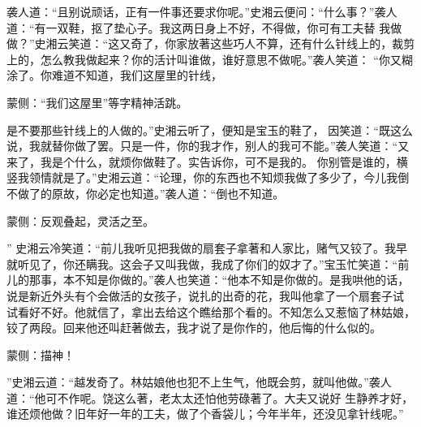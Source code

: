 \begin{parag}
    袭人道：“且别说顽话，正有一件事还要求你呢。”史湘云便问：“什么事？”袭人道：“有一双鞋，抠了垫心子。我这两日身上不好，不得做，你可有工夫替 我做做？”史湘云笑道：“这又奇了，你家放著这些巧人不算，还有什么针线上的，裁剪上的，怎么教我做起来？你的活计叫谁做，谁好意思不做呢。”袭人笑道： “你又糊涂了。你难道不知道，我们这屋里的针线，\begin{note}蒙侧：“我们这屋里”等字精神活跳。\end{note}是不要那些针线上的人做的。”史湘云听了，便知是宝玉的鞋了， 因笑道：“既这么说，我就替你做了罢。只是一件，你的我才作，别人的我可不能。”袭人笑道：“又来了，我是个什么，就烦你做鞋了。实告诉你，可不是我的。 你别管是谁的，横竖我领情就是了。”史湘云道：“论理，你的东西也不知烦我做了多少了，今儿我倒不做了的原故，你必定也知道。”袭人道：“倒也不知道。\begin{note}蒙侧：反观叠起，灵活之至。\end{note}” 史湘云冷笑道：“前儿我听见把我做的扇套子拿著和人家比，赌气又铰了。我早就听见了，你还瞒我。这会子又叫我做，我成了你们的奴才了。”宝玉忙笑道：“前 儿的那事，本不知是你做的。”袭人也笑道：“他本不知是你做的。是我哄他的话，说是新近外头有个会做活的女孩子，说扎的出奇的花，我叫他拿了一个扇套子试 试看好不好。他就信了，拿出去给这个瞧给那个看的。不知怎么又惹恼了林姑娘，铰了两段。回来他还叫赶著做去，我才说了是你作的，他后悔的什么似的。\begin{note}蒙侧：描神！\end{note}”史湘云道：“越发奇了。林姑娘他也犯不上生气，他既会剪，就叫他做。”袭人道：“他可不作呢。饶这么著，老太太还怕他劳碌著了。大夫又说好 生静养才好，谁还烦他做？旧年好一年的工夫，做了个香袋儿；今年半年，还没见拿针线呢。”
\end{parag}


